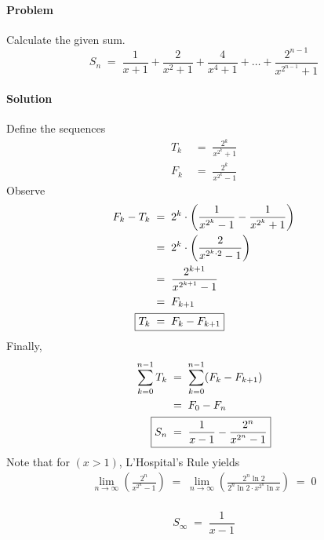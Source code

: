 \documentclass[a4paper, 11pt, reqno]{article}
\newcounter{prob}
\def\problem{\stepcounter{prob}\paragraph{Problem \arabic{prob}}}
\def\solution{\paragraph{Solution}}
\begin{document}
	\clearpage
	\problem
	Calculate the given sum.
	\begin{equation*}
		S_n  \;=\;  \frac{1}{x + 1} + \frac{2}{x^2 + 1} + \frac{4}{x^4 + 1} + \dots + \frac{2^{n-1}}{x^{2^{n-1}} + 1} 
	\end{equation*}
	\solution
	Define the sequences
	\begin{align*}
		T_k \; &= \; \frac{2^k}{x^{2^{k}} + 1} \\
		F_k \; &= \; \frac{2^k}{x^{2^{k}} - 1}
	\end{align*}
	Observe
	\begin{align*}
		F_k - T_k 	\; &= \; 2^k\cdot \left( \frac{1}{x^{2^{k}} - 1} - \frac{1}{x^{2^{k}} + 1} \right) \\
				\; &= \; 2^k\cdot \left( \frac{2}{x^{2^{k}\cdot 2} - 1}  \right) \\
				\; &= \; \frac{2^{k+1}}{x^{2^{k+1}} - 1} \\
				\; &= \; F_{k + 1} \\
		\Aboxed{ T_k \; &= \; F_k - F_{k + 1} }
	\end{align*}
	Finally,
	\begin{align*}
		\sum_{k=0}^{n-1} T_k
		 	\; &= \; \sum_{k=0}^{n-1} (F_{k} - F_{k+1}) \\
			\; &= \; F_0 - F_n \\
		\Aboxed{ S_n	\; &= \; \frac{1}{x - 1} - \frac{2^n}{x^{2^{n}} - 1} }
	\end{align*}
	Note that for $(x > 1)$, L'Hospital's Rule yields
	\begin{align*}
		\lim_{n \to \infty} \left( \frac{2^n}{x^{2^{n}} - 1} \right)
			\; = \;  \lim_{n \to \infty} \left( \frac{2^n\ln{2}}{2^n \ln{2}\cdot x^{2^n}\ln{x}} \right)
			\; = \;  0 
	\end{align*}\\
	\begin{equation*}
		\boxed{ S_\infty \; = \; \frac{1}{x - 1} } \tag{$x > 1$} 
	\end{equation*}
\end{document}
